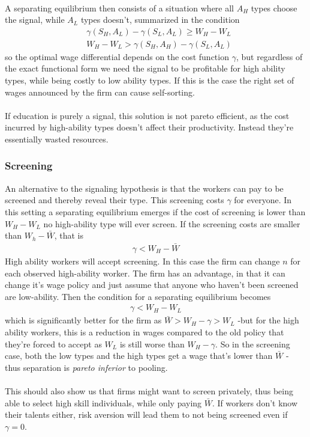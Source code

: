 \documentclass[12pt, a4paper]{article}
\begin{document}
\begin{multicols}{2}
\begin{align*}
\end{align*}
A separating equilibrium then consists of a situation where all $A_H$ types choose the signal, while $A_L$ types doesn't, summarized in the condition
\begin{align*}
&\gamma(S_H,A_L)-\gamma(S_L,A_L) \geq W_H - W_L \\
&W_H-W_L > \gamma(S_H,A_H)- \gamma(S_L,A_L)
\end{align*}
so the optimal wage differential depends on the cost function $\gamma$, but regardless of the exact functional form we need the signal to be profitable for high ability types, while being costly to low ability types. If this is the case the right set of wages announced by the firm can cause self-sorting.
\\ \\
If education is purely a signal, this solution is not pareto efficient, as the cost incurred by high-ability types doesn't affect their productivity. Instead they're essentially wasted resources.

\subsubsection{Screening}
An alternative to the signaling hypothesis is that the workers can pay to be screened and thereby reveal their type. This screening costs $\gamma$ for everyone. In this setting a separating equilibrium emerges if the cost of screening is lower than $W_H-W_L$ no high-ability type will ever screen. If the screening costs are smaller than $W_h - \bar{W}$, that is
\begin{align*}
\gamma < W_H - \bar{W}
\end{align*}
High ability workers will accept screening. In this case the firm can change $n$ for each observed high-ability worker. The firm has an advantage, in that it can change it's wage policy and just assume that anyone who haven't been screened are low-ability. Then the condition for a separating equilibrium becomes
\begin{align*}
\gamma < W_H - W_L
\end{align*}
which is significantly better for the firm as $\bar{W}>W_H-\gamma >W_L$ -but for the high ability workers, this is a reduction in wages compared to the old policy that they're forced to accept as $W_L$ is still worse than $W_H- \gamma$. So in the screening case, both the low types and the high types get a wage that's lower than $\bar{W}$ - thus separation is \textit{pareto inferior} to pooling.
\\ \\
This should also show us that firms might want to screen privately, thus being able to select high skill individuals, while only paying $\bar{W}$. If workers don't know their talents either, risk aversion will lead them to not being screened even if $\gamma = 0$.


\end{multicols}
\end{document}
